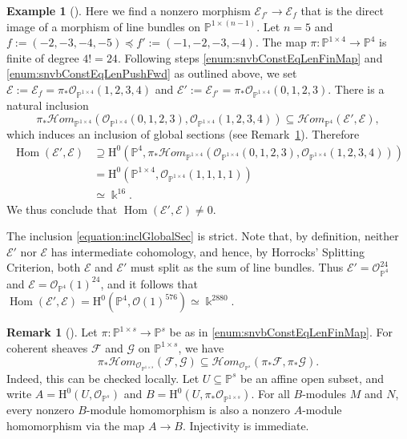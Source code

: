 \documentclass[12pt]{amsart}
\theoremstyle{definition}
\newtheorem{rmk}[equation]{Remark}
\newenvironment{remark}[1][]{\begin{rmk}[#1] \pushQED{\qed}}{\popQED \end{rmk}}
\newtheorem{eg}[equation]{Example}
\newenvironment{example}[1][]{\begin{eg}[#1] \pushQED{\qed}}{\popQED \end{eg}}
\newcommand{\Hom}{\operatorname{Hom}}
\newcommand{\sheafHom}{\mathcal{H}om}
\newcommand{\Hs}{\mathrm{H}}
\newcommand{\EE}{\mathcal{E}}
\newcommand{\FF}{\mathcal{F}}
\newcommand{\GG}{\mathcal{G}}
\newcommand{\cO}{{\mathcal O}}
\newcommand{\PP}{\mathbb{P}}
\begin{document}
\begin{example}
\label {ex:1}
Here we find a nonzero morphism $\EE_{f'}\to \EE_{f}$ that 
is the direct image of a morphism of line bundles on $\PP^{1\times (n-1)}$. 
Let $n=5$ and $f:=(-2,-3,-4,-5) \preceq f':=(-1,-2,-3,-4)$. 
The map $\pi\colon \PP^{1\times 4}\to \PP^4$ is finite of degree $4!=24$. 
Following steps \eqref{enum:snvbConstEqLenFinMap} and \eqref{enum:snvbConstEqLenPushFwd} as outlined above, we set 
$\EE:=\EE_{f}=\pi_* \cO_{\PP^{1\times 4}}(1,2,3,4)$ and 
$\EE':=\EE_{f'}=\pi_* \cO_{\PP^{1\times 4}}(0,1,2,3)$. 
There is a natural inclusion
\begin{equation}
\label{equation:inclGlobalSec}
\pi_* \sheafHom_{\PP^{1\times 4}}\left( \cO_{\PP^{1\times 4}}(0,1,2,3),
\cO_{\PP^{1\times 4}}(1,2,3,4)\right)\subseteq
\sheafHom_{\PP^4}\left( \EE', \EE \right),
\end{equation}
which induces an inclusion of global sections 
(see Remark~\ref{rmk:inclusion}). Therefore
\begin{align*}
  \Hom(\EE', \EE)&\supseteq \Hs^0\left(\PP^4, \pi_* \sheafHom_{\PP^{1\times 4}}\left( \cO_{\PP^{1\times 4}}(0,1,2,3), \cO_{\PP^{1\times 4}}(1,2,3,4)\right) \right)\\
  &= \Hs^0(\PP^{1\times 4}, \cO_{\PP^{1\times 4}}(1,1,1,1))\\
  &\simeq\Bbbk^{16}.
\end{align*}
We thus conclude that $\Hom(\EE', \EE)\ne 0$.

The inclusion \eqref{equation:inclGlobalSec} is strict. 
Note that, by definition, neither $\EE'$ nor $\EE$ has intermediate cohomology, 
and hence, by Horrocks' Splitting Criterion, both $\EE$ and $\EE'$ must split as the sum of line bundles. 
Thus $\EE'=\cO_{\PP^4}^{24}$ and $\EE=\cO_{\PP^4}(1)^{24}$, and it follows 
that $\Hom(\EE',\EE)=\Hs^0(\PP^4,\cO(1)^{576}) \simeq \Bbbk^{2880}$.
\end{example}

\begin{remark}\label{rmk:inclusion}
Let $\pi\colon\PP^{1\times s} \to \PP^s$ be as in \eqref{enum:snvbConstEqLenFinMap}. 
For coherent sheaves $\FF$ and $\GG$ on $\PP^{1\times s}$, we have 
\[
\pi_* \sheafHom_{\cO_{\PP^{1\times s}}}(\FF,\GG)
\subseteq
\sheafHom_{\cO_{\PP^s}}(\pi_*\FF,\pi_*\GG).
\]
Indeed, this can be checked locally. 
Let $U \subseteq \PP^s$ be an affine open subset, 
and write $A = \Hs^0(U, \cO_{\PP^s})$ and 
$B = \Hs^0(U, \pi_*\cO_{\PP^{1\times s}})$. 
For all $B$-modules $M$ and $N$, every nonzero $B$-module 
homomorphism is also a nonzero $A$-module homomorphism 
via the map $A \rightarrow B$.  Injectivity is immediate.
\end{remark}
\end{document}
